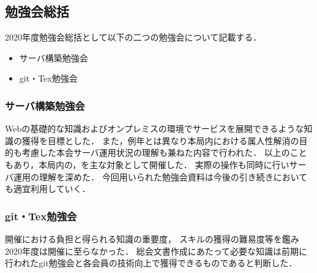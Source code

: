 \subsection*{勉強会総括}


2020年度勉強会総括として以下の二つの勉強会について記載する．
\begin{itemize}
    \item サーバ構築勉強会
    \item git・Tex勉強会
\end{itemize}

\subsubsection*{サーバ構築勉強会}
Webの基礎的な知識およびオンプレミスの環境でサービスを展開できるような知識の獲得を目標とした．
また，例年とは異なり本局内における属人性解消の目的も考慮した本会サーバ運用状況の理解も兼ねた内容で行われた．
以上のこともあり，本局内の\firstGrade{}，\secondGrade{}を主な対象として開催した．
実際の操作も同時に行いサーバ運用の理解を深めた．
今回用いられた勉強会資料は今後の引き続きにおいても適宜利用していく．

\subsubsection*{git・Tex勉強会}
開催における負担と得られる知識の重要度，
スキルの獲得の難易度等を鑑み2020年度は開催に至らなかった．
総会文書作成にあたって必要な知識は前期に行われたgit勉強会と各会員の技術向上で獲得できるものであると判断した．